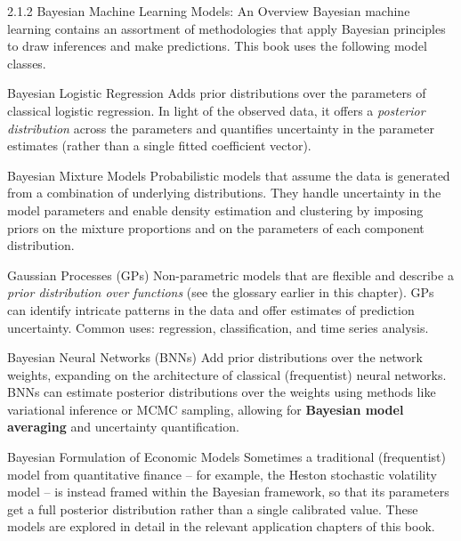 \documentclass[aspectratio=169,10pt]{beamer}
\begin{document}
\begin{frame}[allowframebreaks]{2.1.2 Bayesian Machine Learning Models: An Overview}
  Bayesian machine learning contains an assortment of methodologies that
  apply Bayesian principles to draw inferences and make predictions. This
  book uses the following model classes.

  \begin{block}{Bayesian Logistic Regression}
    Adds prior distributions over the parameters of classical logistic
    regression. In light of the observed data, it offers a
    \emph{posterior distribution} across the parameters and quantifies
    uncertainty in the parameter estimates (rather than a single fitted
    coefficient vector).
  \end{block}

  \begin{block}{Bayesian Mixture Models}
    Probabilistic models that assume the data is generated from a
    combination of underlying distributions. They handle uncertainty in the
    model parameters and enable density estimation and clustering by
    imposing priors on the mixture proportions and on the parameters of each
    component distribution.
  \end{block}

  \framebreak

  \begin{block}{Gaussian Processes (GPs)}
    Non-parametric models that are flexible and describe a
    \emph{prior distribution over functions} (see the glossary earlier in
    this chapter). GPs can identify intricate patterns in the data and
    offer estimates of prediction uncertainty. Common uses: regression,
    classification, and time series analysis.
  \end{block}

  \begin{block}{Bayesian Neural Networks (BNNs)}
    Add prior distributions over the network weights, expanding on the
    architecture of classical (frequentist) neural networks. BNNs can
    estimate posterior distributions over the weights using methods like
    variational inference or MCMC sampling, allowing for
    \textbf{Bayesian model averaging} and uncertainty quantification.
  \end{block}

  \framebreak

  \begin{block}{Bayesian Formulation of Economic Models}
    Sometimes a traditional (frequentist) model from quantitative finance --
    for example, the Heston stochastic volatility model -- is instead framed
    within the Bayesian framework, so that its parameters get a full
    posterior distribution rather than a single calibrated value. These
    models are explored in detail in the relevant application chapters of
    this book.
  \end{block}


\end{frame}
\end{document}
